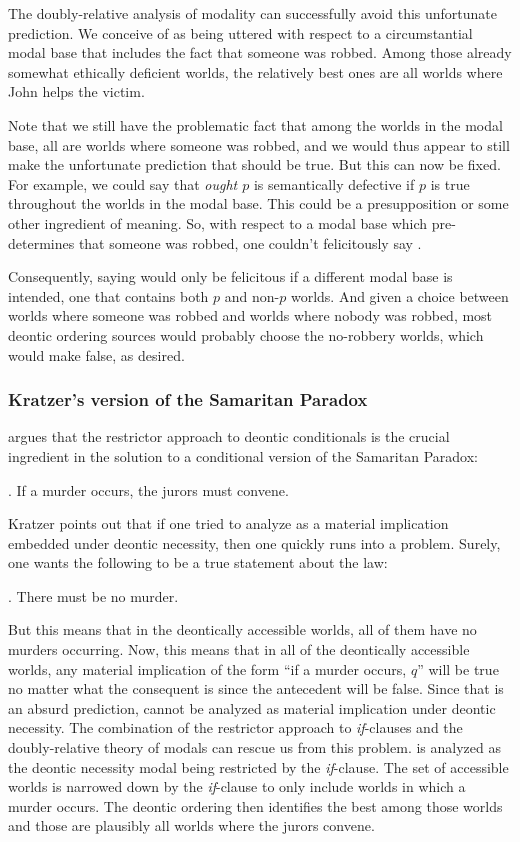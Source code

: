 The doubly-relative analysis of modality can successfully avoid this unfortunate prediction. We conceive of \LLast as being uttered with respect to a circumstantial modal base that includes the fact that someone was robbed. Among those already somewhat ethically deficient worlds, the relatively best ones are all worlds where John helps the victim. 

Note that we still have the problematic fact that among the worlds in the modal base, all are worlds where someone was robbed, and we would thus appear to still make the unfortunate prediction that \Last should be true. But this can now be fixed. For example, we could say that \emph{ought $p$} is semantically defective if $p$ is true throughout the worlds in the modal base. This could be a presupposition or some other ingredient of meaning. So, with respect to a modal base which pre-determines that someone was robbed, one couldn't felicitously say \Last. 

Consequently, saying \Last would only be felicitous if a different modal base is intended, one that contains both $p$ and non-$p$ worlds. And given a choice between worlds where someone was robbed and worlds where nobody was robbed, most deontic ordering sources would probably choose the no-robbery worlds, which would make \Last false, as desired.


\subsubsection{Kratzer's version of the Samaritan Paradox}

\citet{kratzer:1991:modality} argues that the restrictor approach to deontic conditionals is the crucial ingredient in the solution to a conditional version of the Samaritan Paradox:

\ex. If a murder occurs, the jurors must convene.

Kratzer points out that if one tried to analyze \Last as a material implication embedded under deontic necessity, then one quickly runs into a problem. Surely, one wants the following to be a true statement about the law:

\ex. There must be no murder.                           

But this means that in the deontically accessible worlds, all of them have no murders occurring. Now, this means that in all of the deontically accessible worlds, any material implication of the form ``if a murder occurs, $q$'' will be true no matter what the consequent is since the antecedent will be false. Since that is an absurd prediction, \LLast cannot be analyzed as material implication under deontic necessity. The combination of the restrictor approach to \emph{if}-clauses and the doubly-relative theory of modals can rescue us from this problem. \Last is analyzed as the deontic necessity modal being restricted by the \emph{if}-clause. The set of accessible worlds is narrowed down by the \emph{if}-clause to only include worlds in which a murder occurs. The deontic ordering then identifies the best among those worlds and those are plausibly all worlds where the jurors convene.

